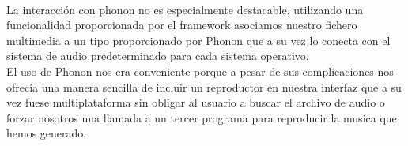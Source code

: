 \newline
\\La interacción con phonon no es especialmente destacable, utilizando una funcionalidad proporcionada por el framework asociamos nuestro fichero multimedia a un tipo proporcionado por Phonon que a su vez lo conecta con el sistema de audio predeterminado para cada sistema operativo.
\\El uso de Phonon nos era conveniente porque a pesar de sus complicaciones nos ofrecía una manera sencilla de incluir un reproductor en nuestra interfaz que a su vez fuese multiplataforma sin obligar al usuario a buscar el archivo de audio o forzar nosotros una llamada a un tercer programa para reproducir la musica que hemos generado.